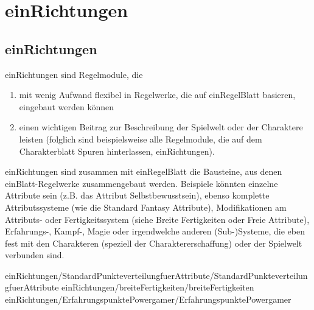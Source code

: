 \part {einRichtungen}
\chapter {einRichtungen}
einRichtungen sind Regelmodule, die
\begin{enumerate}
\item mit wenig Aufwand flexibel in Regelwerke, die auf einRegelBlatt basieren, eingebaut werden können
\item einen wichtigen Beitrag zur Beschreibung der Spielwelt oder der Charaktere leisten (folglich sind beispielsweise alle Regelmodule, die auf dem Charakterblatt Spuren hinterlassen, einRichtungen).
\end{enumerate}
einRichtungen sind zusammen mit einRegelBlatt die Bausteine, aus denen einBlatt-Regelwerke zusammengebaut werden.
Beispiele könnten einzelne Attribute sein (z.B. das Attribut Selbstbewusstsein), ebenso komplette Attributssysteme (wie die Standard Fantasy Attribute), Modifikationen am Attributs- oder Fertigkeitssystem (siehe Breite Fertigkeiten oder Freie Attribute), Erfahrungs-, Kampf-, Magie oder irgendwelche anderen (Sub-)Systeme, die eben fest mit den Charakteren (speziell der Charaktererschaffung) oder der Spielwelt verbunden sind.

 {einRichtungen/StandardPunkteverteilungfuerAttribute/StandardPunkteverteilungfuerAttribute} 
 {einRichtungen/breiteFertigkeiten/breiteFertigkeiten}
 {einRichtungen/ErfahrungspunktePowergamer/ErfahrungspunktePowergamer}
